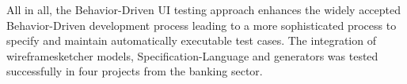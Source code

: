\documentclass{sig-alternate-05-2015}
\begin{document}
All in all, the Behavior-Driven UI testing approach enhances the widely accepted Behavior-Driven development process leading to a more sophisticated process to specify and maintain automatically executable test cases.
The integration of wireframesketcher models, Specification-Language and generators was tested successfully in four projects from the banking sector. 





%



%
%

\end{document}
